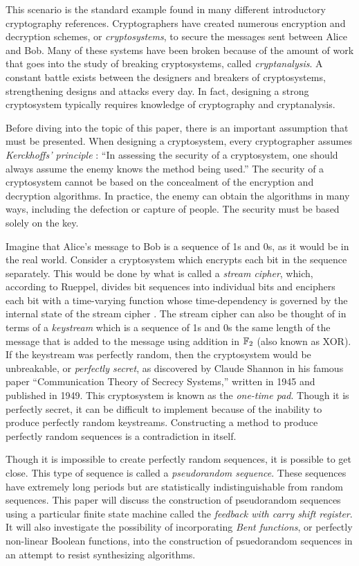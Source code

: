 \par This scenario is the standard example found in many different
introductory cryptography references. Cryptographers have created numerous
encryption and decryption schemes, or {\em cryptosystems}, to secure the
messages sent between Alice and Bob. Many of these systems have been broken
because of the amount of work that goes into the study of breaking
cryptosystems, called {\em cryptanalysis}. A constant battle exists between
the designers and breakers of cryptosystems, strengthening designs and
attacks every day. In fact, designing a strong cryptosystem typically
requires knowledge of cryptography and cryptanalysis.

\par Before diving into the topic of this paper, there is an important
assumption that must be presented. When designing a cryptosystem, every
cryptographer assumes {\em Kerckhoffs' principle} \cite{bk:tw06}: ``In
assessing the security of a cryptosystem, one should always assume the enemy
knows the method being used.'' The security of a cryptosystem cannot be
based on the concealment of the encryption and decryption algorithms. In
practice, the enemy can obtain the algorithms in many ways, including the
defection or capture of people. The security must be based solely on the
key.

\par Imagine that Alice's message to Bob is a sequence of 1s and 0s, as it
would be in the real world. Consider a cryptosystem which encrypts each bit
in the sequence separately. This would be done by what is called a
{\em stream cipher}, which, according to Rueppel, divides bit sequences into
individual bits and enciphers each bit with a time-varying function whose
time-dependency is governed by the internal state of the stream cipher
\cite{bk:r86}. The stream cipher can also be thought of in terms of a
{\em keystream} which is a sequence of 1s and 0s the same length of the
message that is added to the message using addition in $\mathbb{F}_2$ (also known
as XOR). If the keystream was perfectly random, then the cryptosystem would
be unbreakable, or {\em perfectly secret}, as discovered by Claude Shannon
in his famous paper ``Communication Theory of Secrecy Systems,'' written in
1945 and published in 1949. This cryptosystem is known as the {\em one-time
pad}. Though it is perfectly secret, it can be difficult to implement
because of the inability to produce perfectly random keystreams.
Constructing a method to produce perfectly random sequences is a
contradiction in itself.

\par Though it is impossible to create perfectly random sequences, it is
possible to get close. This type of sequence is called a {\em pseudorandom
sequence}. These sequences have extremely long periods but are statistically
indistinguishable from random sequences. This paper will discuss the
construction of pseudorandom sequences using a particular finite state
machine called the {\em feedback with carry shift register}. It will also
investigate the possibility of incorporating {\em Bent functions}, or
perfectly non-linear Boolean functions, into the construction of
psuedorandom sequences in an attempt to resist synthesizing algorithms. 
